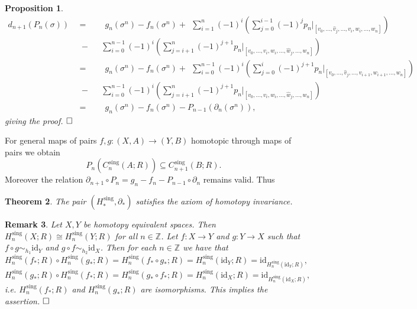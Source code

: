 \documentclass[11pt]{book}
\numberwithin{dummy}{section}
\newtheorem{theorem}{Theorem}[section]
\newtheorem{proposition}[theorem]{Proposition}
\newtheorem{remark}[theorem]{Remark}
\theoremstyle{nonumberbreak}
\newenvironment{pr}[1][]{\ifthenelse{\equal{#1}{}}{\proof}{\proof[#1]}\rm}{\endproof}
\newcommand{\la}{\longrightarrow}
\newcommand{\id}{\mathrm{id}}
\newcommand{\Z}{\mathbb{Z}}
\newcommand{\Cs}{C^{\hspace{1pt}\mathrm{sing}}}
\newcommand{\Hs}{H^{\hspace{1pt}\mathrm{sing}}}
\begin{document}
\begin{spacing}{1.4}
\begin{proposition}
\begin{pr}
\begin{alignat*}{5}
d_{n+1}(P_n(\sigma)) \ \ &=&& \ \ g_n(\sigma^n) - f_n(\sigma^n) +
\ \ \sum_{i=1}^n (-1)^{i} \left( \sum_{j=0}^{i-1} (-1)^{j} p_n\vert_{[v_0, \ldots, \hat{v}_j, \ldots, v_i, w_i, \ldots, w_n]}\right) \\
&\hspace{3pt} -&& \sum_{i=0}^{n-1} (-1)^{i} \left( \sum_{j=i+1}^n (-1)^{j+1} p_n  \vert_{[v_0, \ldots, v_i, w_i, \ldots, \hat{w}_j, \ldots, w_n]} \right) \\ 
&=&& \ \ g_n(\sigma^n) - f_n(\sigma^n) +
\ \ \sum_{i=0}^{n-1} (-1)^{i} \left( \sum_{j=0}^{i} (-1)^{j+1} p_n\vert_{[v_0, \ldots, \hat{v}_j, \ldots, v_{i+1}, w_{i+1}, \ldots, w_n]}\right) \\
&\hspace{3pt} -&& \sum_{i=0}^{n-1} (-1)^{i} \left( \sum_{j=i+1}^n (-1)^{j+1} p_n  \vert_{[v_0, \ldots, v_i, w_i, \ldots, \hat{w}_j, \ldots, w_n]} \right) \\ 
&=&& \ \ g_n(\sigma^n) - f_n(\sigma^n) - P_{n-1}(\partial_n(\sigma^n)),
\end{alignat*}
giving the proof. $\hfill \Box$
\end{pr}


\end{proposition}


For general maps of pairs $f,g: (X,A) \la (Y,B)$ homotopic through maps of pairs we obtain 
$$P_n(\Cs_n(A;R)) \subseteq \Cs_{n+1}(B;R).$$
Moreover the relation $\partial_{n+1}\circ P_n = g_n - f_n - P_{n-1}\circ \partial_n$ remains valid. Thus

\begin{theorem}
The pair $(\Hs_*, \partial_*)$ satisfies the axiom of homotopy invariance.
\end{theorem}

\begin{remark}
Let $X,Y$ be homotopy equivalent spaces. Then $\Hs_n(X;R) \cong \Hs_n(Y;R)$ for all $n \in \Z$. 
\begin{pr}
Let $f: X \la Y$ and $g: Y \la X$ such that $ f \circ g \sim_{h_1} \id_Y$ and $g \circ f \sim_{h_2} \id_X$. Then for each $n \in \Z$ we have that 
$$\Hs_n(f_*;R) \circ \Hs_n(g_*;R) = \Hs_n(f_* \circ g_*;R) = \Hs_n(\id_Y;R) = \id_{\Hs_n(\id_Y;R)},$$
$$\Hs_n(g_*;R) \circ \Hs_n(f_*;R) = \Hs_n(g_* \circ f_*;R) = \Hs_n(\id_X;R) = \id_{\Hs_n(\id_X;R)},$$
i.e. $\Hs_n(f_*;R)$ and $\Hs_n(g_*;R)$ are isomorphisms. This implies the assertion. $\hfill \Box$
\end{pr}

\end{remark}



\end{spacing}
\end{document}
